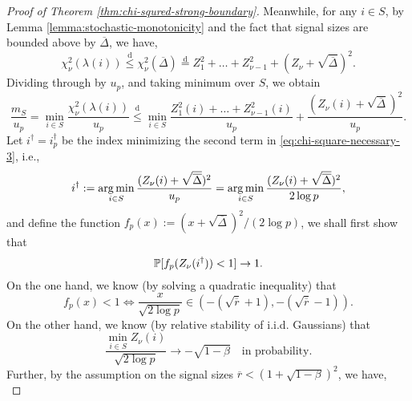 \begin{proof}[Proof of Theorem \ref{thm:chi-squred-strong-boundary}]
Meanwhile, for any $i\in S$, by Lemma \ref{lemma:stochastic-monotonicity} and the fact that signal sizes are bounded above by $\overline{\Delta}$, we have,
\begin{equation*}
    {\chi_\nu^2(\lambda(i))} \stackrel{\mathrm{d}}{\le}
    {\chi_\nu^2(\overline{\Delta})} \stackrel{\mathrm{d}}{=} 
    {Z_1^2 + \ldots + Z_{\nu-1}^2 + \left(Z_\nu + \sqrt{\overline{\Delta}}\right)^2}.
\end{equation*}
Dividing through by $u_p$, and taking minimum over $S$, we obtain
\begin{equation} \label{eq:chi-square-necessary-3}
    \frac{m_S}{u_p} 
    = \min_{i\in S} \frac{\chi_\nu^2(\lambda(i))}{u_p} 
    \stackrel{\mathrm{d}}{\le} \min_{i\in S}\frac{Z_1^2(i) + \ldots + Z_{\nu-1}^2(i)}{u_p} + \frac{(Z_\nu(i) + \sqrt{\overline{\Delta}})^2}{u_p}.
\end{equation}
Let $i^\dagger = i^\dagger_p$ be the index minimizing the second term in \eqref{eq:chi-square-necessary-3}, i.e.,
\begin{equation}
    i^\dagger := \argmin_{i\in S} \frac{(Z_\nu(i) + \sqrt{\overline{\Delta}})^2}{u_p}
    = \argmin_{i\in S} \frac{(Z_\nu(i) + \sqrt{\overline{\Delta}})^2}{2\log{p}},
\end{equation}
and define the function $f_p(x):=(x+\sqrt{\overline{\Delta}})^2/(2\log{p})$, we shall first show that 
\begin{equation} \label{eq:chi-square-necessary-4}
    \P[ f_p(Z_\nu(i^\dagger)) < 1 ] \to 1.
\end{equation}
On the one hand, we know (by solving a quadratic inequality) that
\begin{equation} \label{eq:chi-square-necessary-5}
    f_p(x)<1 \iff \frac{x}{\sqrt{2\log{p}}} \in (-(\sqrt{\overline{r}}+1), -(\sqrt{\overline{r}}-1)).
\end{equation}
On the other hand, we know (by relative stability of i.i.d. Gaussians) that 
\begin{equation} \label{eq:chi-square-necessary-6}
    \frac{\min_{i\in S} Z_\nu(i)}{\sqrt{2\log{p}}}
    \to -\sqrt{1-\beta} \quad\text{in probability}.
\end{equation}
Further, by the assumption on the signal sizes $\overline{r} < (1+\sqrt{1-\beta})^2$, we have,
\begin{equation} \label{eq:chi-square-necessary-7}

\end{equation}
\end{proof}
